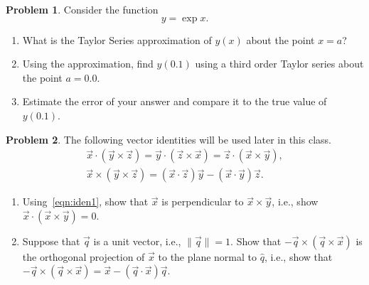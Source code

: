 \documentclass[10pt]{article}
\theoremstyle{definition}
\newtheorem{prob}{Problem}[section]
\newenvironment{subprob}%
{\renewcommand{\theenumi}{\alph{enumi}}\renewcommand{\labelenumi}{(\theenumi)}\begin{enumerate}}%
{\end{enumerate}}%
\begin{document}
\begin{prob}
    Consider the function
    \begin{equation}
        y = \exp{x}.
    \end{equation}
    \begin{subprob}
    \item What is the Taylor Series approximation of \( y (x) \) about the point \( x = a \)?
    \item Using the approximation, find \( y (0.1) \) using a third order Taylor series about the point \( a = 0.0 \).
    \item Estimate the error of your answer and compare it to the true value of \( y(0.1)\).
    \end{subprob}
\end{prob}
\begin{prob}
The following vector identities will be used later in this class.
\begin{gather}
\vec x \cdot (\vec y \times \vec z) =
\vec y \cdot (\vec z \times \vec x) =
\vec z \cdot (\vec x \times \vec y),\label{eqn:iden1}\\
\vec x \times (\vec y \times \vec z) =
(\vec x \cdot \vec z) \vec y - (\vec x\cdot \vec y) \vec z.
\end{gather}
\begin{subprob}
\item Using~\cref{eqn:iden1}, show that $\vec x$ is perpendicular to $\vec x\times \vec y$, i.e., show $\vec x\cdot (\vec x\times \vec y)=0$.
\item Suppose that $\vec q$ is a unit vector, i.e., $\|\vec q\|=1$. Show that $- \vec q \times (\vec q \times \vec x)$ is the orthogonal projection of $\vec x$ to the plane normal to $\hat q$, i.e., show that $- \vec q \times (\vec q \times \vec x)=\vec x - (\vec q\cdot \vec x) \vec q$.
\end{subprob}

\end{prob}
\end{document}
